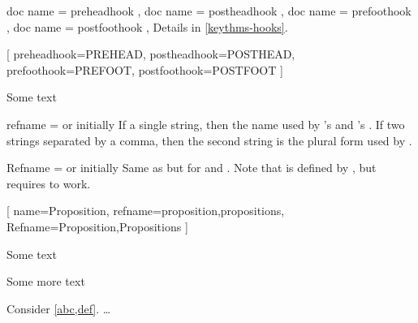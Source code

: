 \documentclass{ltxdoc}
\begin{document}
\begin{docKeys}[
  doc parameter = {=\meta{code}},
  doc description = initially unset,
  ]
  {
    { doc name = preheadhook },
    { doc name = postheadhook },
    { doc name = prefoothook },
    { doc name = postfoothook },
  }
Details in \autoref{keythms-hooks}.

\begin{tcbwritetemp}
[
  preheadhook=PREHEAD,
  postheadhook=POSTHEAD,
  prefoothook=PREFOOT,
  postfoothook=POSTFOOT
]
\end{tcbwritetemp}

\begin{keythmscode}[withpreamble]
\begin{test}
Some text
\end{test}
\end{keythmscode}

\end{docKeys}

\begin{docKey}{refname}
  {= \textrm{or} }
  {initially }
If a single string, then the name used by 's  and 's . If two strings separated by a comma, then the second string is the plural form used by .
\end{docKey}

\begin{docKey}{Refname}
  {= \textrm{or} }
  {initially }
Same as  but for  and . Note that  is defined by , but requires  to work.

\begin{tcbwritetemp}
[
  name=Proposition,
  refname={proposition,propositions},
  Refname={Proposition,Propositions}
  ]
\end{tcbwritetemp}

\begin{keythmscode}[withpreamble]
\begin{prop}[label=abc]
Some text
\end{prop}
\begin{prop}[label=def]
Some more text
\end{prop}
\begin{theorem}
Consider \cref{abc,def}.
 \dots
\end{theorem}
\end{keythmscode}

\end{docKey}
\end{document}

